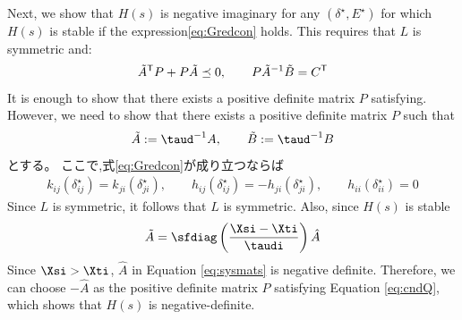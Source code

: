 \documentclass[graybox, envcountchap]{svmult}
\begin{document}
\begin{証明}
Next, we show that $H(s)$ is negative imaginary for any $(\delta^{\star},E^{\star})$ for which $H(s)$ is stable if the expression\ref{eq:Gredcon} holds.
This requires that $L$ is symmetric and:
\begin{align}\label{eq:cndQ}
\tilde{A}^{\sf T}P + P\tilde{A} \preceq 0
,\qquad
P\tilde{A}^{-1}\tilde{B}=C^{\sf T}
\end{align}
It is enough to show that there exists a positive definite matrix $P$ satisfying.
However, we need to show that there exists a positive definite matrix $P$ such that
\begin{align*}
\tilde{A}:= \taud^{-1}A
,\qquad
\tilde{B}:= \taud^{-1}B
\end{align*}
とする。
ここで,式\ref{eq:Gredcon}が成り立つならば
\begin{align*}
k_{ij}(\delta_{ij}^{\star}) =
k_{ji}(\delta_{ji}^{\star})
,\qquad
h_{ij}(\delta_{ij}^{\star}) = 
- h_{ji}(\delta_{ji}^{\star}),\qquad
h_{ii}(\delta_{ii}^{\star}) = 0
\end{align*}
Since $L$ is symmetric, it follows that $L$ is symmetric.
Also, since $H(s)$ is stable
\begin{align*}
\tilde{A} = 
\sfdiag \left( \frac{ \Xsi -  \Xti }{ \taudi } \right)
\hat{A}
\end{align*}
Since $\Xsi > \Xti$, $\hat{A}$ in Equation \ref{eq:sysmats} is negative definite.
Therefore, we can choose $-\hat{A}$ as the positive definite matrix $P$ satisfying Equation \ref{eq:cndQ}, which shows that $H(s)$ is negative-definite.



\end{証明}
\end{document}
